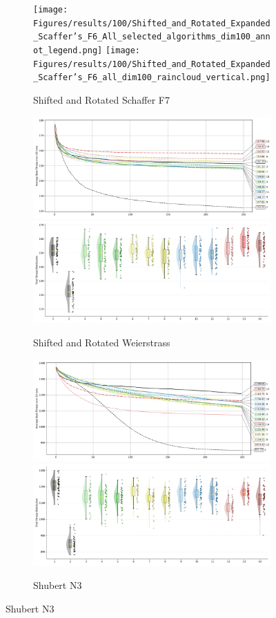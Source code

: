 \begin{figure}[p]\ContinuedFloat
\renewcommand\thesubfigure{C.\arabic{figure}.\arabic{subfigure}} %

    \centering

\begin{subfigure}{1\textwidth}
    \centering
    \texttt{[image: Figures/results/100/Shifted\_and\_Rotated\_Expanded\_Scaffer’s\_F6\_All\_selected\_algorithms\_dim100\_annot\_legend.png]}
    \texttt{[image: Figures/results/100/Shifted\_and\_Rotated\_Expanded\_Scaffer’s\_F6\_all\_dim100\_raincloud\_vertical.png]}
    \caption{Shifted and Rotated Schaffer F7}
\end{subfigure}

\begin{subfigure}{1\textwidth}
    \centering
    \includegraphics[width=.49\textwidth]{Figures/results/100/Shifted_and_Rotated_Weierstrass_All_selected_algorithms_dim100_annot_legend.png}
    \includegraphics[width=.49\textwidth]{Figures/results/100/Shifted_and_Rotated_Weierstrass_all_dim100_raincloud_vertical.png}
    \caption{Shifted and Rotated Weierstrass}
\end{subfigure}

\begin{subfigure}{1\textwidth}
    \centering
    \includegraphics[width=.49\textwidth]{Figures/results/100/Shubert_N3_All_selected_algorithms_dim100_annot_legend.png}
    \includegraphics[width=.49\textwidth]{Figures/results/100/Shubert_N3_all_dim100_raincloud_vertical.png}
    \caption{Shubert N3}
\end{subfigure}


\end{figure}
